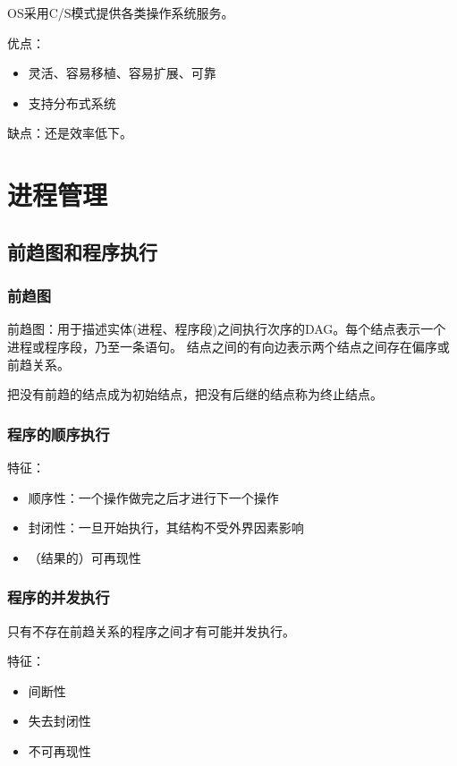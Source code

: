 \documentclass[12pt, a4paper, oneside]{ctexart}
\begin{document}
OS采用C/S模式提供各类操作系统服务。

优点：
\begin{itemize}
    \item 灵活、容易移植、容易扩展、可靠
    \item 支持分布式系统
\end{itemize}

缺点：还是效率低下。

\newpage

\section{进程管理}

\subsection{前趋图和程序执行}

\subsubsection{前趋图}

前趋图：用于描述实体(进程、程序段)之间执行次序的DAG。每个结点表示一个进程或程序段，乃至一条语句。
结点之间的有向边表示两个结点之间存在偏序或前趋关系。

把没有前趋的结点成为初始结点，把没有后继的结点称为终止结点。

\subsubsection{程序的顺序执行}

特征：
\begin{itemize}
    \item 顺序性：一个操作做完之后才进行下一个操作
    \item 封闭性：一旦开始执行，其结构不受外界因素影响
    \item （结果的）可再现性
\end{itemize}

\subsubsection{程序的并发执行}

只有不存在前趋关系的程序之间才有可能并发执行。

特征：
\begin{itemize}
    \item 间断性
    \item 失去封闭性
    \item 不可再现性
\end{itemize}
\end{document}
